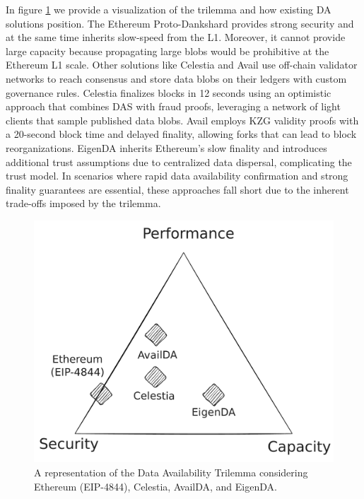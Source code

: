 \documentclass[11pt]{article}
\begin{document}
In figure \ref{fig:da-trilemma} we provide a visualization of the trilemma and how existing DA solutions position. The Ethereum Proto-Dankshard provides strong security and at the same time inherits slow-speed from the L1. Moreover, it cannot provide large capacity because propagating large blobs would be prohibitive at the Ethereum L1 scale. Other solutions like Celestia and Avail use off-chain validator networks to reach consensus and store data blobs on their ledgers with custom governance rules. Celestia finalizes blocks in 12 seconds using an optimistic approach that combines DAS with fraud proofs, leveraging a network of light clients that sample published data blobs. Avail employs KZG validity proofs with a 20-second block time and delayed finality, allowing forks that can lead to block reorganizations. EigenDA inherits Ethereum’s slow finality and introduces additional trust assumptions due to centralized data dispersal, complicating the trust model. In scenarios where rapid data availability confirmation and strong finality guarantees are essential, these approaches fall short due to the inherent trade-offs imposed by the trilemma.

\begin{figure}[htp]
    \centering
    \includegraphics[scale=0.28]{images/da-trilemma.pdf}
    \caption{A representation of the Data Availability Trilemma considering Ethereum (EIP-4844), Celestia, AvailDA, and EigenDA.}
    \label{fig:da-trilemma}
\end{figure}
\end{document}
